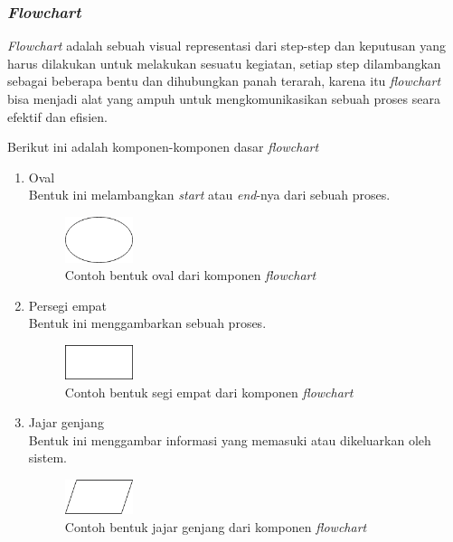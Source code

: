 \documentclass[a4paper]{article}
\newcommand{\subsubbab}[1]{%
    \subsubsection{#1}%
}
\begin{document}
\subsubbab{\textit{Flowchart}}
\textit{Flowchart} adalah sebuah visual representasi dari step-step dan keputusan yang harus dilakukan untuk melakukan sesuatu kegiatan, setiap step dilambangkan sebagai beberapa bentu dan dihubungkan panah terarah, karena itu \textit{flowchart} bisa menjadi alat yang ampuh untuk mengkomunikasikan sebuah proses seara efektif dan efisien\autocite{smartdraw-flowchart}.

Berikut ini adalah komponen-komponen dasar \textit{flowchart}
\begin{enumerate}
    \item Oval\\
    Bentuk ini melambangkan \textit{start} atau \textit{end}-nya dari sebuah proses.\\
    \begin{figure}[h]
        \centering
        \includegraphics*[width=2cm]{./diagram/flowchart/component/oval.png}
        \caption{Contoh bentuk oval dari komponen \textit{flowchart}}
    \end{figure}
    \newpage
    \item Persegi empat\\
    Bentuk ini menggambarkan sebuah proses.\\
    \begin{figure}[h]
        \centering
        \includegraphics*[width=2cm]{./diagram/flowchart/component/rectangle.png}
        \caption{Contoh bentuk segi empat dari komponen \textit{flowchart}}
    \end{figure}
    \item Jajar genjang\\
    Bentuk ini menggambar informasi yang memasuki atau dikeluarkan oleh sistem.\\
    \begin{figure}[h]
        \centering
        \includegraphics*[width=2cm]{./diagram/flowchart/component/jajar genjang.png}
        \caption{Contoh bentuk jajar genjang dari komponen \textit{flowchart}}
    \end{figure}

\end{enumerate}
\end{document}

